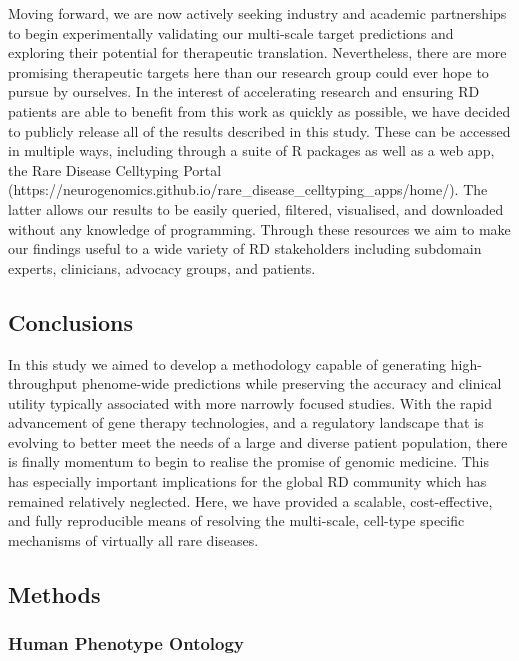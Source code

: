 \documentclass[
]{article}
\begin{document}
Moving forward, we are now actively seeking industry and academic
partnerships to begin experimentally validating our multi-scale target
predictions and exploring their potential for therapeutic translation.
Nevertheless, there are more promising therapeutic targets here than our
research group could ever hope to pursue by ourselves. In the interest
of accelerating research and ensuring RD patients are able to benefit
from this work as quickly as possible, we have decided to publicly
release all of the results described in this study. These can be
accessed in multiple ways, including through a suite of R packages as
well as a web app, the Rare Disease Celltyping Portal
(https://neurogenomics.github.io/rare\_disease\_celltyping\_apps/home/).
The latter allows our results to be easily queried, filtered,
visualised, and downloaded without any knowledge of programming. Through
these resources we aim to make our findings useful to a wide variety of
RD stakeholders including subdomain experts, clinicians, advocacy
groups, and patients.

\subsection{Conclusions}\label{sec-conclusions}

In this study we aimed to develop a methodology capable of generating
high-throughput phenome-wide predictions while preserving the accuracy
and clinical utility typically associated with more narrowly focused
studies. With the rapid advancement of gene therapy technologies, and a
regulatory landscape that is evolving to better meet the needs of a
large and diverse patient population, there is finally momentum to begin
to realise the promise of genomic medicine. This has especially
important implications for the global RD community which has remained
relatively neglected. Here, we have provided a scalable, cost-effective,
and fully reproducible means of resolving the multi-scale, cell-type
specific mechanisms of virtually all rare diseases.

\subsection{Methods}\label{sec-methods}

\subsubsection{Human Phenotype Ontology}\label{human-phenotype-ontology}
\end{document}
